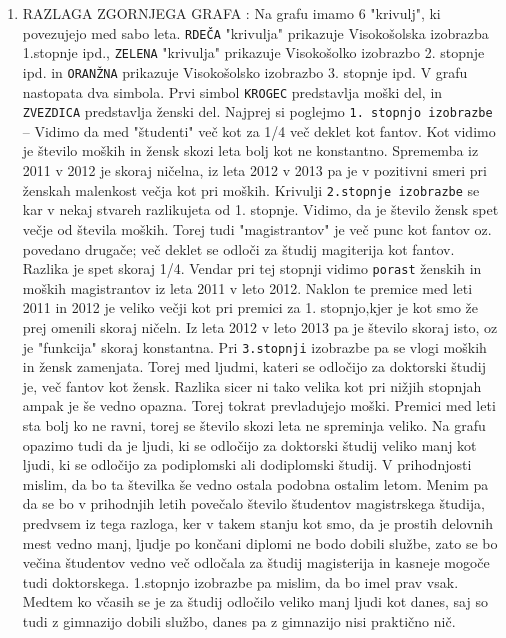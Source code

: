 \documentclass[11pt,a4paper]{article}
\begin{document}
\begin{enumerate}
{ } 
\begin{enumerate} 
\item{RAZLAGA ZGORNJEGA GRAFA} :  Na grafu imamo 6 "krivulj", ki povezujejo med sabo leta. \verb|RDEČA| "krivulja" prikazuje Visokošolska izobrazba 1.stopnje ipd., \verb|ZELENA| "krivulja" prikazuje Visokošolko izobrazbo 2. stopnje ipd. in \verb|ORANŽNA| prikazuje Visokošolsko izobrazbo 3. stopnje ipd. V grafu nastopata dva simbola. Prvi simbol \verb|KROGEC| predstavlja moški del, in \verb|ZVEZDICA| predstavlja ženski del. Najprej si poglejmo \verb|1. stopnjo izobrazbe| -- Vidimo da med "študenti" več kot za 1/4 več deklet kot fantov. Kot vidimo je število moških in žensk skozi leta bolj kot ne konstantno. Sprememba iz 2011 v 2012 je skoraj ničelna, iz leta 2012 v 2013 pa je v pozitivni smeri pri ženskah malenkost večja kot pri moških. Krivulji \verb|2.stopnje izobrazbe| se kar v nekaj stvareh razlikujeta od 1. stopnje. Vidimo, da je število žensk spet večje od števila moških. Torej tudi "magistrantov" je več punc kot fantov oz. povedano drugače; več deklet se odloči za študij magiterija kot fantov. Razlika je spet skoraj 1/4. Vendar pri tej stopnji vidimo \verb|porast| ženskih in moških magistrantov iz leta 2011 v leto 2012. Naklon te premice med leti 2011 in 2012 je veliko večji kot pri premici za 1. stopnjo,kjer je kot smo že prej omenili skoraj ničeln. Iz leta 2012 v leto 2013 pa je število skoraj isto, oz je "funkcija" skoraj konstantna. Pri \verb|3.stopnji| izobrazbe pa se vlogi moških in žensk zamenjata. Torej med ljudmi, kateri se odločijo za doktorski študij je, več fantov kot žensk. Razlika sicer ni tako velika kot pri nižjih stopnjah ampak je še vedno opazna. Torej tokrat prevladujejo moški. Premici med leti sta bolj ko ne ravni, torej se število skozi leta ne spreminja veliko. Na grafu opazimo tudi da je ljudi, ki se odločijo za doktorski študij veliko manj kot ljudi, ki se odločijo za podiplomski ali dodiplomski študij. V prihodnjosti mislim, da bo ta številka še vedno ostala podobna ostalim letom. Menim pa da se bo v prihodnjih letih povečalo število študentov magistrskega študija, predvsem iz tega razloga, ker v takem stanju kot smo, da je prostih delovnih mest vedno manj, ljudje po končani diplomi ne bodo dobili službe, zato se bo večina študentov vedno več odločala za študij magisterija in kasneje mogoče tudi doktorskega. 1.stopnjo izobrazbe pa mislim, da bo imel prav vsak. Medtem ko včasih se je za študij odločilo veliko manj ljudi kot danes, saj so tudi z gimnazijo dobili službo, danes pa z gimnazijo nisi praktično nič.


\end{enumerate}
\end{enumerate}
\end{document}
